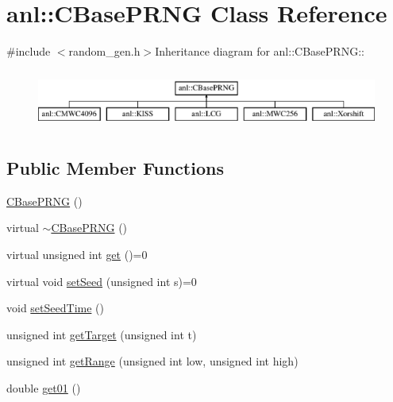 \hypertarget{classanl_1_1CBasePRNG}{
\section{anl::CBasePRNG Class Reference}
\label{classanl_1_1CBasePRNG}
}


{\ttfamily \#include $<$random\_\-gen.h$>$}Inheritance diagram for anl::CBasePRNG::\begin{figure}[H]
\begin{center}
\leavevmode
\includegraphics[height=1.96491cm]{classanl_1_1CBasePRNG}
\end{center}
\end{figure}
\subsection*{Public Member Functions}
\begin{DoxyCompactItemize}
\item 
\hyperlink{classanl_1_1CBasePRNG_aa5af1d977bcddc28584a1e0133701c30}{CBasePRNG} ()
\item 
virtual \hyperlink{classanl_1_1CBasePRNG_a05752d435025c6cbb29cb5c5e50d2257}{$\sim$CBasePRNG} ()
\item 
virtual unsigned int \hyperlink{classanl_1_1CBasePRNG_a7a0fcd0d3c4b0f9f160835b4b254a1ed}{get} ()=0
\item 
virtual void \hyperlink{classanl_1_1CBasePRNG_a6e9a81522fe055749739e4d79b5aa27e}{setSeed} (unsigned int s)=0
\item 
void \hyperlink{classanl_1_1CBasePRNG_a23758173ff6c4d248d9b619896e9a049}{setSeedTime} ()
\item 
unsigned int \hyperlink{classanl_1_1CBasePRNG_a78fb7f29598253f3eb1aaf0a9fc87058}{getTarget} (unsigned int t)
\item 
unsigned int \hyperlink{classanl_1_1CBasePRNG_a6427bf7c28728bbe15077c34a2736dbd}{getRange} (unsigned int low, unsigned int high)
\item 
double \hyperlink{classanl_1_1CBasePRNG_a82990127f6a4b9cee3b48861f622e4b3}{get01} ()
\end{DoxyCompactItemize}


